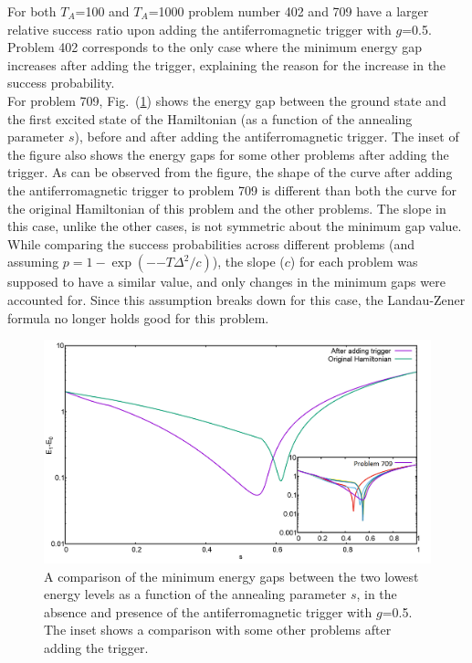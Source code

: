 \documentclass[../main.tex]{subfiles}
\begin{document}
For both $T_A$=100 and $T_A$=1000 problem number 402 and 709 have a larger relative success ratio upon adding the antiferromagnetic trigger with $g$=0.5. Problem 402 corresponds to the only case where the minimum energy gap increases after adding the trigger, explaining the reason for the increase in the success probability.\\
For problem 709, Fig.~(\ref{fig:a15}) shows the energy gap between the ground state and the first excited state of the Hamiltonian (as a function of the annealing parameter $s$), before and after adding the antiferromagnetic trigger. The inset of the figure also shows the energy gaps for some other problems after adding the trigger. As can be observed from the figure, the shape of the curve after adding the antiferromagnetic trigger to problem 709 is different than both the curve for the original Hamiltonian of this problem and the other problems. The slope in this case, unlike the other cases, is not symmetric about the minimum gap value. While comparing the success probabilities across different problems (and assuming $p=1-\exp({-{-T {\Delta}^2/c}})$), the slope ($c$) for each problem was supposed to have a similar value, and only changes in the minimum gaps were accounted for. Since this assumption breaks down for this case, the Landau-Zener formula no longer holds good for this problem.\\

\begin{figure}
\centering 
\includegraphics[scale=0.24]{Mingap_709_g0_A.png}
\caption{A comparison of the minimum energy gaps between the two lowest energy levels as a function of the annealing parameter $s$, in the absence and presence of the antiferromagnetic trigger with $g$=0.5. The inset shows a comparison with some other problems after adding the trigger.}
\label{fig:a15}
\end{figure}
\end{document}
